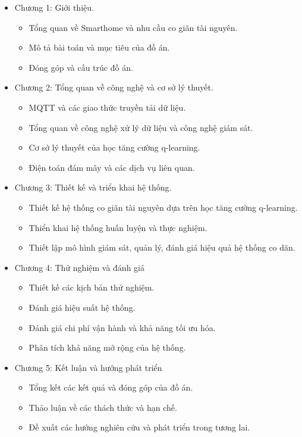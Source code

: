 \begin{itemize}
    \item Chương 1: Giới thiệu.
          \begin{itemize}
              \item Tổng quan về Smarthome và nhu cầu co giãn tài nguyên.
              \item Mô tả bài toán và mục tiêu của đồ án.
              \item Đóng góp và cấu trúc đồ án.
          \end{itemize}

    \item Chương 2: Tổng quan về công nghệ và cơ sở lý thuyết.
          \begin{itemize}
              \item MQTT và các giao thức truyền tải dữ liệu.
              \item Tổng quan về công nghệ xử lý dữ liệu và công nghệ giám sát.
              \item Cơ sở lý thuyết của học tăng cường q-learning.
              \item Điện toán đám mây và các dịch vụ liên quan.
          \end{itemize}

    \item Chương 3: Thiết kế và triển khai hệ thống.
          \begin{itemize}
              \item Thiết kế hệ thống co giãn tài nguyên dựa trên học tăng cường q-learning.
              \item Thiển khai hệ thống huấn luyện và thực nghiệm.
              \item Thiết lập mô hình giám sát, quản lý, đánh giá hiệu quả hệ thống co dãn.
          \end{itemize}

    \item Chương 4: Thử nghiệm và đánh giá
          \begin{itemize}
              \item Thiết kế các kịch bản thử nghiệm.
              \item Đánh giá hiệu suất hệ thống.
              \item Đánh giá chi phí vận hành và khả năng tối ưu hóa.
              \item Phân tích khả năng mở rộng của hệ thống.
          \end{itemize}

    \item Chương 5: Kết luận và hướng phát triển
          \begin{itemize}
              \item Tổng kết các kết quả và đóng góp của đồ án.
              \item Thảo luận về các thách thức và hạn chế.
              \item Đề xuất các hướng nghiên cứu và phát triển trong tương lai.
          \end{itemize}
\end{itemize}